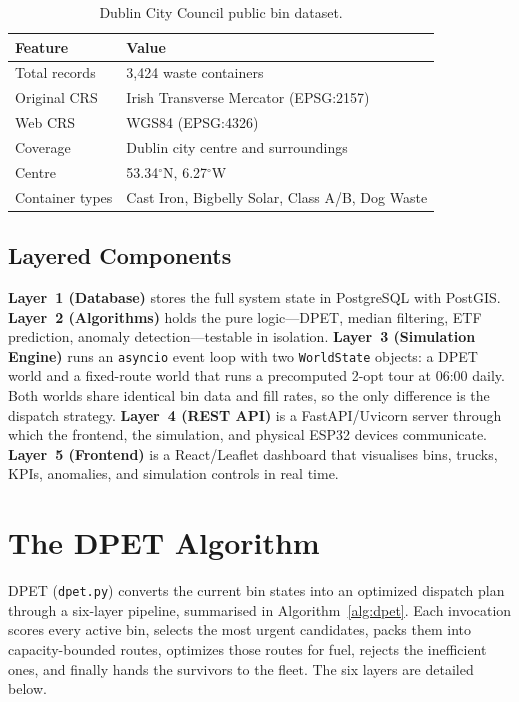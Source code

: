 \documentclass[conference, a4paper]{IEEEtran}
\begin{document}
\begin{table}[t]
\centering
\caption{Dublin City Council public bin dataset.}
\label{tab:dataset}
\footnotesize
\begin{tabular}{ll}
\toprule
\textbf{Feature} & \textbf{Value} \\
\midrule
Total records   & 3{,}424 waste containers \\
Original CRS    & Irish Transverse Mercator (EPSG:2157) \\
Web CRS         & WGS84 (EPSG:4326) \\
Coverage        & Dublin city centre and surroundings \\
Centre          & 53.34$^\circ$N, 6.27$^\circ$W \\
Container types & Cast Iron, Bigbelly Solar, Class A/B, Dog Waste \\
\bottomrule
\end{tabular}
\end{table}

\subsection{Layered Components}
\textbf{Layer~1 (Database)} stores the full system state in PostgreSQL with PostGIS. \textbf{Layer~2 (Algorithms)} holds the pure logic---DPET, median filtering, ETF prediction, anomaly detection---testable in isolation. \textbf{Layer~3 (Simulation Engine)} runs an \texttt{asyncio} event loop with two \texttt{WorldState} objects: a DPET world and a fixed-route world that runs a precomputed 2-opt tour at 06:00 daily. Both worlds share identical bin data and fill rates, so the only difference is the dispatch strategy. \textbf{Layer~4 (REST API)} is a FastAPI/Uvicorn server through which the frontend, the simulation, and physical ESP32 devices communicate. \textbf{Layer~5 (Frontend)} is a React/Leaflet dashboard that visualises bins, trucks, KPIs, anomalies, and simulation controls in real time.

\section{The DPET Algorithm}
DPET (\texttt{dpet.py}) converts the current bin states into an optimized dispatch plan through a six-layer pipeline, summarised in Algorithm~\ref{alg:dpet}. Each invocation scores every active bin, selects the most urgent candidates, packs them into capacity-bounded routes, optimizes those routes for fuel, rejects the inefficient ones, and finally hands the survivors to the fleet. The six layers are detailed below.
\end{document}
